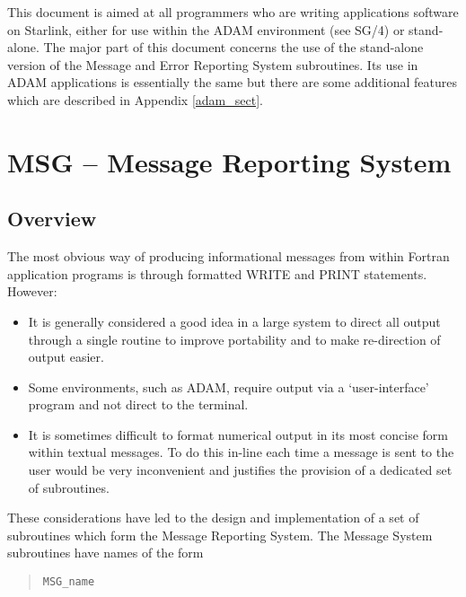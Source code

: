 \documentclass[twoside,11pt]{article}
\newcommand{\htmlref}[2]{#1}
\newcommand{\latex}[1]{#1}
\newcommand{\xref}[3]{#1}
\newcommand{\xlabel}[1]{}
\renewcommand{\_}{\texttt{\symbol{95}}}
\begin{document}
This document is aimed at all programmers who are writing applications software
on Starlink, either for use within the 
\xref{ADAM environment}{sg4}{}\latex{ (see SG/4)}
or stand-alone.
The major part of this document concerns the use of the stand-alone version of
the Message and Error Reporting System subroutines.
Its use in ADAM applications is essentially the same but there are some
\htmlref
{additional features}{adam_sect}\latex{ which are described in Appendix \ref{adam_sect}}.

\section{\xlabel{msg_message_reporting_system}MSG -- Message Reporting System \xlabel{msg}}

\subsection{\xlabel{overview}Overview}

The most obvious way of producing informational messages from within 
Fortran application programs is through formatted WRITE and PRINT 
statements.
However:
\begin{itemize}
\item It is generally considered a good idea in a large system to direct
all output through a single routine to improve portability and to make
re-direction of output easier.
\item Some environments, such as ADAM, require output via a `user-interface'
program and not direct to the terminal.
\item It is sometimes difficult to format numerical output in its most
concise form within textual messages.
To do this in-line each time a message is sent to the user would be very
inconvenient and justifies the provision of a dedicated set of subroutines. 
\end{itemize} 
These considerations have led to the design and implementation of a set of
subroutines which form the Message Reporting System.
The Message System subroutines have names of the form

\begin {quote}
\begin {small}
\begin{verbatim}
MSG_name
\end{verbatim}
\end {small}
\end {quote}
\end{document}
